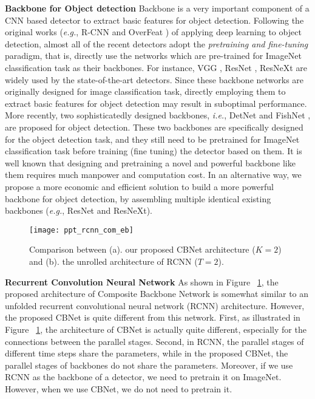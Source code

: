 \documentclass[letterpaper]{article} \usepackage{aaai20}  \usepackage{multirow}
\begin{document}
\textbf{Backbone for Object detection}
Backbone is a very important component of a CNN based detector to extract basic features for object detection. Following the original works (\textit{e.g.}, R-CNN \cite{girshick2014rich} and OverFeat \cite{sermanet2013overfeat}) of applying deep learning to object detection, almost all of the recent detectors adopt the \textit{pretraining and fine-tuning} paradigm, that is, directly use the networks which are pre-trained for ImageNet classification task as their backbones. For instance, VGG \cite{simonyan2014very}, ResNet \cite{he2016deep}, ResNeXt \cite{xie2017aggregated} are widely used by the state-of-the-art detectors. Since these backbone networks are originally designed for image classification task, directly employing them to extract basic features for object detection may result in suboptimal performance. More recently, two sophisticatedly designed backbones, \textit{i.e.}, DetNet \cite{li2018detnet} and FishNet \cite{sun2018fishnet}, are proposed for object detection. These two backbones are specifically designed for the object detection task, and they still need to be pretrained for ImageNet classification task before training (fine tuning) the detector based on them. It is well known that designing and pretraining a novel and powerful backbone like them requires much manpower and computation cost. In an alternative way, we propose a more economic and efficient solution to build a more powerful backbone for object detection, by assembling multiple identical existing backbones (\textit{e.g.}, ResNet and ResNeXt).

\begin{figure}[t]
	\centering
	\texttt{[image: ppt\_rcnn\_com\_eb]}
	\caption{Comparison between (a). our proposed CBNet architecture ($K=2$) and  (b). the unrolled architecture of RCNN \cite{liang2015recurrent}($T=2$).}
	\label{fig:RCNN}
\end{figure}

\textbf{Recurrent Convolution Neural Network}
As shown in Figure ~\ref{fig:RCNN}, the proposed architecture of Composite Backbone Network is somewhat similar to an unfolded recurrent convolutional neural network (RCNN) \cite{liang2015recurrent} architecture. However, the proposed CBNet is quite different from this network. First, as illustrated in Figure ~\ref{fig:RCNN}, the architecture of CBNet is actually quite different, especially for the connections between the parallel stages. Second, in RCNN, the parallel stages of different time steps share the parameters, while in the proposed CBNet, the parallel stages of backbones do not share the parameters. Moreover, if we use RCNN as the backbone of a detector, we need to pretrain it on ImageNet. However, when we use CBNet, we do not need to pretrain it.
\end{document}
